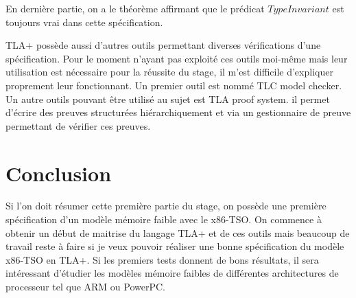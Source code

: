 \documentclass[12pt,a4paper]{article}
\begin{document}
En dernière partie, on a le théorème affirmant que le prédicat $TypeInvariant$ est toujours vrai dans cette spécification.

TLA+ possède aussi d'autres outils permettant diverses vérifications d'une spécification. Pour le moment n'ayant pas exploité ces outils moi-même mais leur utilisation est nécessaire pour la réussite du stage, il m'est difficile d'expliquer proprement leur fonctionnant. Un premier outil est nommé TLC model checker. Un autre outils pouvant être utilisé au sujet est TLA proof system. il permet d'écrire des preuves structurées hiérarchiquement et via un gestionnaire de preuve permettant de vérifier ces preuves.  

\section{Conclusion}

Si l'on doit résumer cette première partie du stage, on possède une première spécification d'un modèle mémoire faible avec le x86-TSO. On commence à obtenir un début de maitrise du langage TLA+ et de ces outils mais beaucoup de travail reste à faire si je veux pouvoir réaliser une bonne spécification du modèle x86-TSO en TLA+. Si les premiers tests donnent de bons résultats, il sera intéressant d'étudier les modèles mémoire faibles de différentes architectures de processeur tel que ARM ou PowerPC.

\clearpage



\nocite{Alglave:2009:SPA:1481839.1481842, Owens:2010:RIC:1883978.1884011, PETRI, Saraswat:2007:TMM:1229428.1229469, Sewell:2010:XRU:1785414.1785443, Turon:2014:GNW:2714064.2660243, Boehm:2011:YDK:2076796.2088916}
\end{document}
